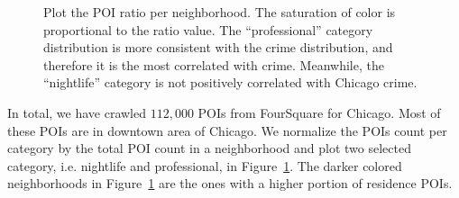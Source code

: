 \begin{figure}[tb]
\centering
{}
\caption{Plot the  POI ratio per neighborhood. The saturation of color is proportional to the ratio value. The ``professional'' category distribution is more consistent with the crime distribution, and therefore it is the most correlated with crime. Meanwhile, the ``nightlife'' category is not positively correlated with Chicago crime.}
\label{fig:poi-coef}
\end{figure}

In total, we have crawled $112,000$  POIs from FourSquare for Chicago. Most of these POIs are in downtown area of Chicago. We normalize the POIs count per category by the total POI count in a neighborhood and plot two selected category, i.e. nightlife and professional, in Figure~\ref{fig:poi-coef}.  The darker colored neighborhoods in Figure~\ref{fig:poi-coef} are the ones with a higher portion of residence POIs.



